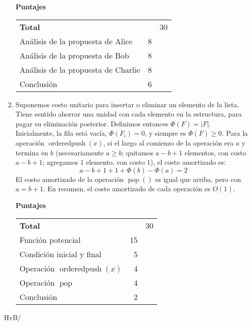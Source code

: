 \documentclass[english, spanish, fleqn]{article}
\begin{document}
\begin{enumerate}
    \vspace*{2\baselineskip}
    \begin{minipage}{1.0\linewidth}
      {\Large\textbf{Puntajes}}\\[0.5\baselineskip]
      \begin{tabular}{lrr}
	\textbf{Total}					     &	  & 30 \\
        Análisis de la propuesta de Alice                    &  8 &    \\
        Análisis de la propuesta de Bob                      &  8 &    \\
        Análisis de la propuesta de Charlie                  &  8 &    \\
        Conclusión                                           &  6 &
      \end{tabular}
    \end{minipage}
\pagebreak[4]
  \item %
    Suponemos costo unitario para insertar o eliminar un elemento de la lista.
    Tiene sentido ahorrar una unidad con cada elemento en la estructura,
    para pagar su eliminación posterior.
    Definimos entonces \(\Phi(F) = \lvert F \rvert\).
    Inicialmente,
    la fila está vacía,
    \(\Phi(F_i) = 0\),
    y siempre es \(\Phi(F) \ge 0\).
    Para la operación \(\operatorname{orderedpush}(x)\),
    si el largo al comienzo de la operación era \(a\) y termina en \(b\)
    (necesariamente \(a \ge b\);
     quitamos \(a - b + 1\) elementos,
     con costo \(a - b + 1\);
     agregamos \(1\) elemento,
     con costo \(1\)),
    el costo amortizado es:
    \begin{equation*}
      a - b + 1 + 1 + \Phi(b) - \Phi(a)
	= 2
    \end{equation*}
    El costo amortizado de la operación \(\operatorname{pop}()\)
    es igual que arriba,
    pero con \(a = b + 1\).
    En resumen,
    el costo amortizado de cada operación es \(O(1)\).

    \vspace*{2\baselineskip}
    \begin{minipage}{1.0\linewidth}
      {\Large\textbf{Puntajes}}\\[0.5\baselineskip]
      \begin{tabular}{lrr}
	\textbf{Total}					     &	  & 30 \\
	Función potencial				     & 15 &    \\
	Condición inicial y final			     &	5 &    \\
	Operación \(\operatorname{orderedpush}(x)\)	     &	4 &    \\
	Operación \(\operatorname{pop}\)		     &	4 &    \\
	Conclusión					     &	2 &
      \end{tabular}
    \end{minipage}
  \end{enumerate}
  \vfill\hfill HvB/\LaTeXe
\end{document}
